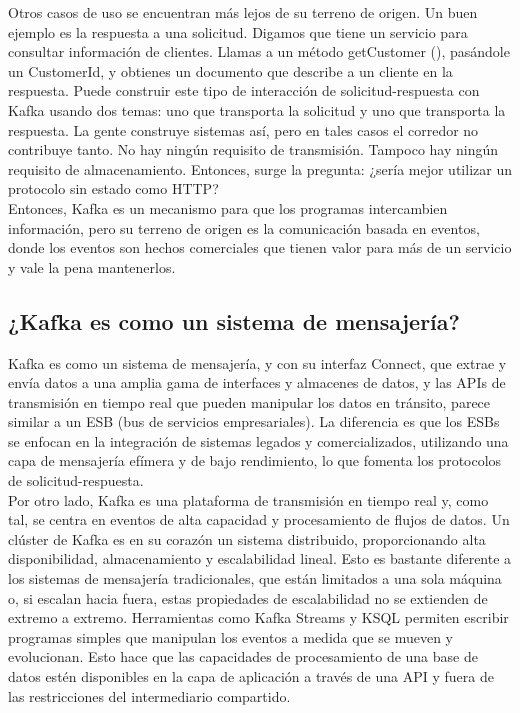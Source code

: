 \documentclass{article}
\begin{document}
Otros casos de uso se encuentran más lejos de su terreno de origen. Un buen ejemplo es la respuesta a una solicitud. Digamos que tiene un servicio para consultar información de clientes. Llamas a un método getCustomer (), pasándole un CustomerId, y obtienes un documento que describe a un cliente en la respuesta. Puede construir este tipo de interacción de solicitud-respuesta con Kafka usando dos temas: uno que transporta la solicitud y uno que transporta la respuesta. La gente construye sistemas así, pero en tales casos el corredor no contribuye tanto. No hay ningún requisito de transmisión. Tampoco hay ningún requisito de almacenamiento. Entonces, surge la pregunta: ¿sería mejor utilizar un protocolo sin estado como HTTP?\\

Entonces, Kafka es un mecanismo para que los programas intercambien información, pero su terreno de origen es la comunicación basada en eventos, donde los eventos son hechos comerciales que tienen valor para más de un servicio y vale la pena mantenerlos.
\subsection{¿Kafka es como un sistema de mensajería?}
Kafka es como un sistema de mensajería, y con su interfaz Connect, que extrae y envía datos a una amplia gama de interfaces y almacenes de datos, y las APIs de transmisión en tiempo real que pueden manipular los datos en tránsito, parece similar a un ESB (bus de servicios empresariales). La diferencia es que los ESBs se enfocan en la integración de sistemas legados y comercializados, utilizando una capa de mensajería efímera y de bajo rendimiento, lo que fomenta los protocolos de solicitud-respuesta.\\

Por otro lado, Kafka es una plataforma de transmisión en tiempo real y, como tal, se centra en eventos de alta capacidad y procesamiento de flujos de datos. Un clúster de Kafka es en su corazón un sistema distribuido, proporcionando alta disponibilidad, almacenamiento y escalabilidad lineal. Esto es bastante diferente a los sistemas de mensajería tradicionales, que están limitados a una sola máquina o, si escalan hacia fuera, estas propiedades de escalabilidad no se extienden de extremo a extremo. Herramientas como Kafka Streams y KSQL permiten escribir programas simples que manipulan los eventos a medida que se mueven y evolucionan. Esto hace que las capacidades de procesamiento de una base de datos estén disponibles en la capa de aplicación a través de una API y fuera de las restricciones del intermediario compartido.\\
\end{document}
